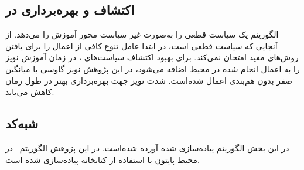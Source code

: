          \subsection{اکتشاف و بهره‌برداری در 
 }
 الگوریتم
  یک سیاست قطعی را به‌صورت غیر سیاست محور آموزش را می‌دهد. از آنجایی که سیاست قطعی است،
در ابتدا عامل تنوع کافی از اعمال را برای یافتن روش‌های مفید امتحان نمی‌کند. برای بهبود اکتشاف سیاست‌های ،
در زمان آموزش
 نویز را به اعمال انجام شده در محیط اضافه می‌شود، در این پژوهش نویز گاوسی با میانگین صفر بدون هم‌بندی اعمال شده‌است.
 شدت نویز جهت بهره‌برداری بهتر در طول زمان کاهش می‌یابد.
  
  \subsection{شبه‌کد 
  }
   در این بخش الگوریتم
  پیاده‌سازی شده آورده شده‌است. در این پژوهش الگوریتم~ در محیط پایتون با استفاده از کتابخانه
   \cite{paszke2017automatic}
  پیاده‌سازی شده ‌است.
         
